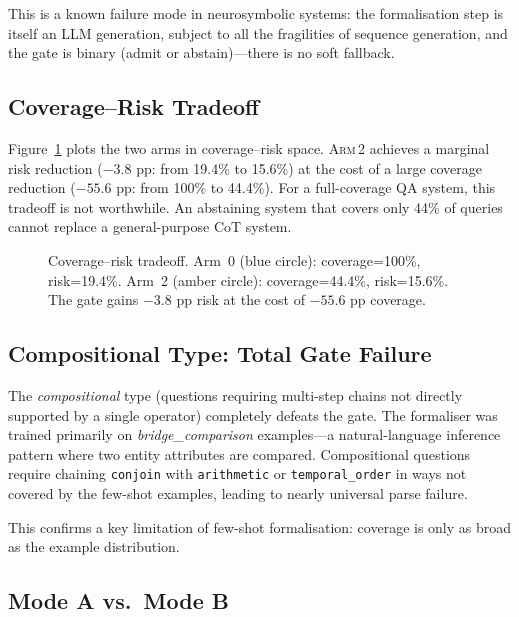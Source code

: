 \documentclass[11pt]{article}
\newcommand{\armii}{\textsc{Arm\,2}}
\begin{document}
This is a known failure mode in neurosymbolic systems: the
formalisation step is itself an LLM generation, subject to all the
fragilities of sequence generation, and the gate is binary (admit or
abstain)---there is no soft fallback.

\subsection{Coverage--Risk Tradeoff}

Figure~\ref{fig:riskcoverage} plots the two arms in coverage--risk space.
\armii{} achieves a marginal risk reduction ($-3.8$ pp: from 19.4\% to
15.6\%) at the cost of a large coverage reduction ($-55.6$ pp: from 100\%
to 44.4\%).  For a full-coverage QA system, this tradeoff is not worthwhile.
An abstaining system that covers only 44\% of queries cannot replace a
general-purpose CoT system.

\begin{figure}[h]
\centering
\caption{Coverage--risk tradeoff. Arm~0 (blue circle): coverage=100\%,
  risk=19.4\%. Arm~2 (amber circle): coverage=44.4\%, risk=15.6\%.
  The gate gains $-3.8$ pp risk at the cost of $-55.6$ pp coverage.}
\label{fig:riskcoverage}
\end{figure}

\subsection{Compositional Type: Total Gate Failure}

The \emph{compositional} type (questions requiring multi-step chains not
directly supported by a single operator) completely defeats the gate.
The formaliser was trained primarily on \emph{bridge\_comparison}
examples---a natural-language inference pattern where two entity
attributes are compared.  Compositional questions require chaining
\texttt{conjoin} with \texttt{arithmetic} or \texttt{temporal\_order}
in ways not covered by the few-shot examples, leading to nearly universal
parse failure.

This confirms a key limitation of few-shot formalisation: coverage is
only as broad as the example distribution.

\subsection{Mode A vs.\ Mode B}
\end{document}
